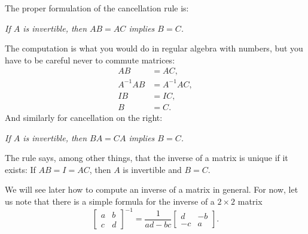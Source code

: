 
The proper formulation of the cancellation rule is:
\begin{center}
\emph{If $A$ is invertible,
then
$AB = AC$ implies $B=C$.}
\end{center}
The computation is what you would do in regular algebra with numbers,
but you have to
be careful never to commute matrices:
\begin{align*}
AB & = AC , \\
A^{-1}AB & = A^{-1}AC , \\
IB & = IC , \\
B & = C .
\end{align*}
And similarly for cancellation on the right:
\begin{center}
\emph{If $A$ is invertible,
then $BA = CA$ implies $B=C$.}
\end{center}

The rule says, among other things, that the
inverse of a matrix is unique if it exists:  If $AB = I = AC$, then $A$ is
invertible and $B=C$.

We will see later how to compute an inverse of a matrix
in general.  For now,
let us note that there is a simple formula for the inverse of
a $2 \times 2$ matrix
\begin{equation*}
\begin{bmatrix}
a & b \\
c & d
\end{bmatrix}^{-1}
=
\frac{1}{ad-bc}
\begin{bmatrix}
d & -b \\
-c & a
\end{bmatrix} .
\end{equation*}

